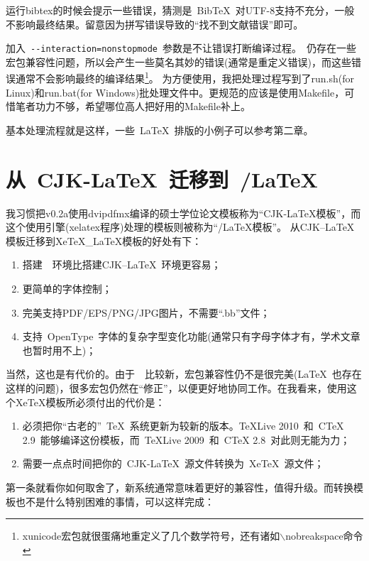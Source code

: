 运行bibtex的时候会提示一些错误，猜测是~{{\sc Bib}\TeX}~对UTF-8支持不充分，一般不影响最终结果。留意因为拼写错误导致的``找不到文献错误''即可。

加入~\verb|--interaction=nonstopmode|~参数是不让错误打断编译过程。\XeTeX~仍存在一些宏包兼容性问题，所以会产生一些莫名其妙的错误(通常是重定义错误)，而这些错误通常不会影响最终的编译结果\footnote{xunicode宏包就很蛋痛地重定义了几个数学符号，还有诸如$\backslash$nobreakspace命令}。
为方便使用，我把处理过程写到了run.sh(for Linux)和run.bat(for Windows)批处理文件中。更规范的应该是使用Makefile，可惜笔者功力不够，希望哪位高人把好用的Makefile补上。

基本处理流程就是这样，一些~\LaTeX~排版的小例子可以参考第二章。

\section{从~CJK-\LaTeX~迁移到~\XeTeX/\LaTeX}
\label{sec:whydvipdfm}

我习惯把v0.2a使用dvipdfmx编译的硕士学位论文模板称为``CJK-\LaTeX{}模板''，而这个使用\XeTeX{}引擎(xelatex程序)处理的模板则被称为``\XeTeX/\LaTeX{}模板''。
从CJK--LaTeX模板迁移到XeTeX\_LaTeX模板的好处有下：
\begin{enumerate}
\item[\large\smiley] 搭建~\XeTeX~环境比搭建CJK--\LaTeX~环境更容易；
\item[\large\smiley] 更简单的字体控制；
\item[\large\smiley] 完美支持PDF/EPS/PNG/JPG图片，不需要``.bb''文件；
\item[\large\smiley] 支持~OpenType~字体的复杂字型变化功能(通常只有字母字体才有，学术文章也暂时用不上)；
\end{enumerate}

当然，这也是有代价的。由于~\XeTeX~比较新，宏包兼容性仍不是很完美(\LaTeX~也存在这样的问题)，很多宏包仍然在“修正”，以便更好地协同工作。在我看来，使用这个XeTeX模板所必须付出的代价是：

\begin{enumerate}
\item[\large\frownie] 必须把你“古老的”~\TeX~系统更新为较新的版本。TeXLive 2010~和~CTeX 2.9~能够编译这份模板，而~TeXLive 2009~和~CTeX 2.8~对此则无能为力；
\item[\large\frownie] 需要一点点时间把你的~CJK-LaTeX~源文件转换为~XeTeX~源文件；
\end{enumerate}

第一条就看你如何取舍了，新系统通常意味着更好的兼容性，值得升级。而转换模板也不是什么特别困难的事情，可以这样完成：

